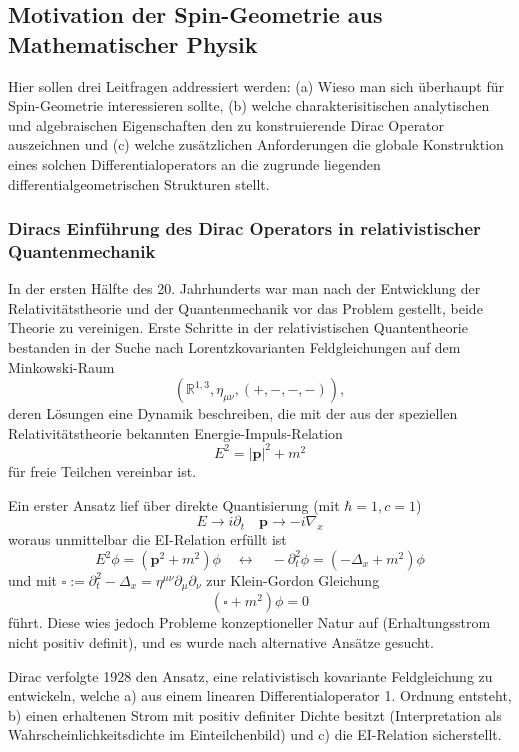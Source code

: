 \documentclass[10pt, letterpaper]{article}
\begin{document}
\pagebreak


\subsection{Motivation der Spin-Geometrie aus Mathematischer Physik}


Hier sollen drei Leitfragen addressiert werden: (a) Wieso man sich überhaupt für Spin-Geometrie interessieren sollte, (b) welche charakterisitischen analytischen und algebraischen Eigenschaften den zu konstruierende Dirac Operator auszeichnen und (c) welche zusätzlichen Anforderungen die globale Konstruktion eines solchen Differentialoperators an die zugrunde liegenden differentialgeometrischen Strukturen stellt. 



\subsubsection{Diracs Einführung des Dirac Operators in relativistischer Quantenmechanik}

In der ersten Hälfte des 20. Jahrhunderts war man nach der Entwicklung der Relativitätstheorie und der Quantenmechanik vor das Problem gestellt, beide Theorie zu vereinigen. Erste Schritte in der relativistischen Quantentheorie bestanden in der Suche nach Lorentzkovarianten Feldgleichungen auf dem Minkowski-Raum
$$\left(\mathbb{R}^{1,3}, \eta_{\mu \nu},(+,-,-,-)\right),$$
deren Lösungen eine Dynamik beschreiben, die mit der aus der speziellen Relativitätstheorie bekannten Energie-Impuls-Relation
$$E^2=|\mathbf{p}|^2+m^2$$
für freie Teilchen vereinbar ist.

Ein erster Ansatz lief über direkte Quantisierung (mit $\hbar=1, c=1$)
$$E\to i\partial_t \quad \mathbf{p}\to -i\nabla_x$$
woraus unmittelbar die EI-Relation erfüllt ist 
$$E^2\phi=(\mathbf{p}^2+m^2)\phi \quad \longleftrightarrow \quad -\partial_t^2\phi=(-\Delta_x+m^2)\phi$$
und mit $\square:=\partial_t^2-\Delta_x=\eta^{\mu\nu}\partial_\mu\partial_\nu$ zur Klein-Gordon Gleichung
$$(\square +m^2)\phi=0$$
führt. Diese wies jedoch Probleme konzeptioneller Natur auf (Erhaltungsstrom nicht positiv definit), und es wurde nach alternative Ansätze gesucht. 

Dirac verfolgte 1928 den Ansatz, eine relativistisch kovariante Feldgleichung zu entwickeln, welche a) aus einem linearen Differentialoperator 1. Ordnung entsteht, b) einen erhaltenen Strom mit positiv definiter Dichte besitzt (Interpretation als Wahrscheinlichkeitsdichte im Einteilchenbild) und c) die EI-Relation sicherstellt. 
\end{document}
